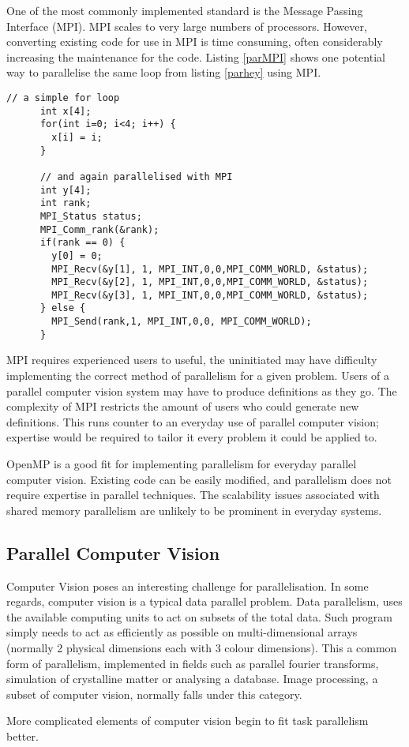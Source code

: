 \documentclass[../main.tex]{subfiles}
\begin{document}
    One of the most commonly implemented standard is the Message Passing Interface (MPI).
    MPI scales to very large numbers of processors.
    However, converting existing code for use in MPI is time consuming, often considerably increasing the maintenance for the code.
    Listing \ref{parMPI} shows one potential way to parallelise the same loop from listing \ref{parhey} using MPI.
    \begin{lstlisting}[caption = 'A simple loop parallelised with MPI', label=parMPI]
      // a simple for loop
      int x[4];
      for(int i=0; i<4; i++) {
        x[i] = i;
      }

      // and again parallelised with MPI
      int y[4];
      int rank;
      MPI_Status status;
      MPI_Comm_rank(&rank);
      if(rank == 0) {
        y[0] = 0;
        MPI_Recv(&y[1], 1, MPI_INT,0,0,MPI_COMM_WORLD, &status);
        MPI_Recv(&y[2], 1, MPI_INT,0,0,MPI_COMM_WORLD, &status);
        MPI_Recv(&y[3], 1, MPI_INT,0,0,MPI_COMM_WORLD, &status);
      } else {
        MPI_Send(rank,1, MPI_INT,0,0, MPI_COMM_WORLD);
      }
    \end{lstlisting}

    MPI requires experienced users to useful, the uninitiated may have difficulty implementing the correct method of parallelism for a given problem.
    Users of a parallel computer vision system may have to produce definitions as they go.
    The complexity of MPI restricts the amount of users who could generate new definitions.
    This runs counter to an everyday use of parallel computer vision; expertise would be required to tailor it every problem it could be applied to.
    
    OpenMP is a good fit for implementing parallelism for everyday parallel computer vision.
    Existing code can be easily modified, and parallelism does not require expertise in parallel techniques.
    The scalability issues associated with shared memory parallelism are unlikely to be prominent in everyday systems.
  \subsection{Parallel Computer Vision}
    Computer Vision poses an interesting challenge for parallelisation.
    In some regards, computer vision is a typical data parallel problem.
    Data parallelism, uses the available computing units to act on subsets of the total data.
    Such program simply needs to act as efficiently as possible on multi-dimensional arrays (normally 2 physical dimensions each with 3 colour dimensions).
    This a common form of parallelism, implemented in fields such as parallel fourier transforms, simulation of crystalline matter or analysing a database.
    Image processing, a subset of computer vision, normally falls under this category.
    
    More complicated elements of computer vision begin to fit task parallelism better.
    
  \biblio
\end{document}
